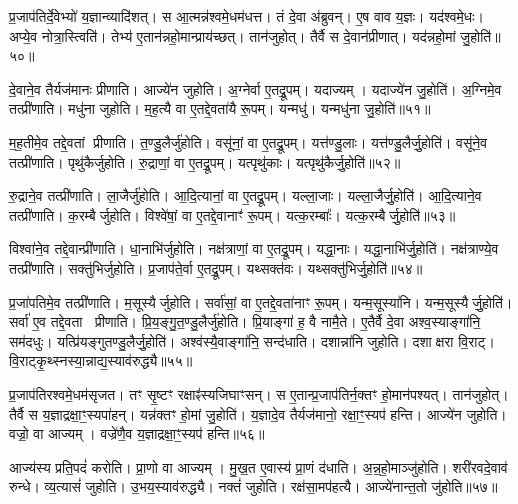 प्र॒जाप॑तिर्दे॒वेभ्यो॑ य॒ज्ञान्व्यादि॑शत्।
स आ॒त्मन्न॑श्वमे॒धम॑धत्त।
तं दे॒वा अ॑ब्रुवन्।
ए॒ष वाव य॒ज्ञः।
यद॑श्वमे॒धः।
अप्ये॒व नोत्रा॒स्त्विति॑।
तेभ्य॑ ए॒तान॑न्नहो॒मान्प्राय॑च्छत्।
तान॑जुहोत्।
तैर्वै स दे॒वान॑प्रीणात्।
यद॑न्नहो॒मां जु॒होति॑॥५०॥

दे॒वाने॒व तैर्यज॑मानः प्रीणाति।
आज्ये॑न जुहोति।
अ॒ग्नेर्वा ए॒तद्रू॒पम्।
यदाज्यम्।
यदाज्ये॑न जु॒होति॑।
अ॒ग्निमे॒व तत्प्री॑णाति।
मधु॑ना जुहोति।
म॒ह॒त्यै वा ए॒तद्दे॒वता॑यै रू॒पम्।
यन्मधु॑।
यन्मधु॑ना जु॒होति॑॥५१॥

म॒ह॒तीमे॒व तद्दे॒वतां प्रीणाति।
त॒ण्डु॒लैर्जु॑होति।
वसू॑नां॒ वा ए॒तद्रू॒पम्।
यत्त॑ण्डु॒लाः।
यत्त॑ण्डु॒लैर्जु॒होति॑।
वसू॑ने॒व तत्प्री॑णाति।
पृथु॑कैर्जुहोति।
रु॒द्राणां॒ वा ए॒तद्रू॒पम्।
यत्पृथु॑काः।
यत्पृथु॑कैर्जु॒होति॑॥५२॥

रु॒द्राने॒व तत्प्री॑णाति।
ला॒जैर्जु॑होति।
आ॒दि॒त्यानां॒ वा ए॒तद्रू॒पम्।
यल्ला॒जाः।
यल्ला॒जैर्जु॒होति॑।
आ॒दि॒त्याने॒व तत्प्री॑णाति।
क॒रम्बैर्जुहोति।
विश्वे॑षां॒ वा ए॒तद्दे॒वानाꣳ॑ रू॒पम्।
यत्क॒रम्बाः᳚।
यत्क॒रम्बैर्जु॒होति॑॥५३॥

विश्वा॑ने॒व तद्दे॒वान्प्री॑णाति।
धा॒नाभि॑र्जुहोति।
नक्ष॑त्राणां॒ वा ए॒तद्रू॒पम्।
यद्धा॒नाः।
यद्धा॒नाभि॑र्जु॒होति॑।
नक्ष॑त्राण्ये॒व तत्प्री॑णाति।
सक्तु॑भिर्जुहोति।
प्र॒जाप॑ते॒र्वा ए॒तद्रू॒पम्।
यथ्सक्त॑वः।
यथ्सक्तु॑भिर्जु॒होति॑॥५४॥

प्र॒जा॑पतिमे॒व तत्प्री॑णाति।
म॒सूस्यैर्जुहोति।
सर्वा॑सां॒ वा ए॒तद्दे॒वता॑नाꣳ रू॒पम्।
यन्म॒सूस्या॑नि।
यन्म॒सूस्यैर्जु॒होति॑।
सर्वा॑ ए॒व तद्दे॒वता प्रीणाति।
प्रि॒य॒ङ्गु॒त॒ण्डु॒लैर्जु॑होति।
प्रि॒याङ्गा॑ ह॒ वै नामै॒ते।
ए॒तैर्वै दे॒वा अश्व॒स्याङ्गा॑नि॒ सम॑दधुः।
यत्प्रि॑यङ्गुतण्डु॒लैर्जु॒होति॑।
अश्व॑स्यै॒वाङ्गा॑नि॒ सन्द॑धाति।
दशान्ना॑नि जुहोति।
दशाक्षरा वि॒राट्।
वि॒राट्कृ॒थ्स्नस्या॒न्नाद्य॒स्याव॑रुद्ध्यै॥५५॥\anuvakamend[जु॒होति॒ मधु॑ना जु॒होति॒ पृथु॑कैर्जु॒होति॑ क॒रम्बैर्जु॒होति॒ सक्तु॑भिर्जु॒होति॑ प्रियङ्गुतण्डु॒लैर्जु॒होति॑ च॒त्वारि॑ च (अ॒न्नहो॒मानाज्ये॑ना॒ग्नेर्मधु॑ना तण़्डु॒लैः पृथु॑कैर्ला॒जैः क॒रम्बैर्धा॒नाभिः॒ सक्तु॑भिर्म॒सूस्यै प्रियङ्गुतण्डु॒लैर्द॒शान्ना॑नि॒ द्वाद॑श।
)]

प्र॒जाप॑तिरश्वमे॒धम॑सृजत।
तꣳ सृ॒ष्टꣳ रक्षाꣴ॑स्यजिघाꣳसन्।
स ए॒तान्प्र॒जाप॑तिर्न॒क्तꣳ हो॒मान॑पश्यत्।
तान॑जुहोत्।
तैर्वै स य॒ज्ञाद्रक्षा॒ꣳ॒स्यपा॑हन्।
यन्न॑क्तꣳ हो॒मां जु॒होति॑।
य॒ज्ञादे॒व तैर्यज॑मानो॒ रक्षा॒ꣳ॒स्यप॑ हन्ति।
आज्ये॑न जुहोति।
वज्रो॒ वा आज्यम्।
वज्रे॑णै॒व य॒ज्ञाद्रक्षा॒ꣳ॒स्यप॑ हन्ति॥५६॥

आज्य॑स्य प्रति॒पदं॑ करोति।
प्रा॒णो वा आज्यम्।
मु॒ख॒त ए॒वास्य॑ प्रा॒णं द॑धाति।
अ॒न्न॒हो॒माञ्जु॑होति।
शरी॑रवदे॒वाव॑ रुन्धे।
व्य॒त्यासं॑ जुहोति।
उ॒भय॒स्याव॑रुद्ध्यै।
नक्तं॑ जुहोति।
रक्ष॑सा॒मप॑हत्यै।
आज्ये॑नान्त॒तो जु॑होति॥५७॥

